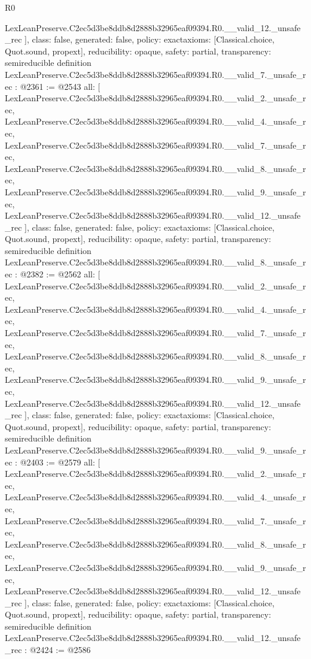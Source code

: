\begin{lexlean}{R0}
\begin{coremodule}
{    LexLeanPreserve.C2ec5d3be8ddb8d2888b32965eaf09394.R0.__valid_12._unsafe_rec
  ],
  class: false,
  generated: false,
  policy: exact{axioms: [Classical.choice, Quot.sound, propext]},
  reducibility: opaque{},
  safety: partial,
  transparency: semireducible
}
definition LexLeanPreserve.C2ec5d3be8ddb8d2888b32965eaf09394.R0.__valid_7._unsafe_rec : @2361 := @2543 {
  all: [
    LexLeanPreserve.C2ec5d3be8ddb8d2888b32965eaf09394.R0.__valid_2._unsafe_rec,
    LexLeanPreserve.C2ec5d3be8ddb8d2888b32965eaf09394.R0.__valid_4._unsafe_rec,
    LexLeanPreserve.C2ec5d3be8ddb8d2888b32965eaf09394.R0.__valid_7._unsafe_rec,
    LexLeanPreserve.C2ec5d3be8ddb8d2888b32965eaf09394.R0.__valid_8._unsafe_rec,
    LexLeanPreserve.C2ec5d3be8ddb8d2888b32965eaf09394.R0.__valid_9._unsafe_rec,
    LexLeanPreserve.C2ec5d3be8ddb8d2888b32965eaf09394.R0.__valid_12._unsafe_rec
  ],
  class: false,
  generated: false,
  policy: exact{axioms: [Classical.choice, Quot.sound, propext]},
  reducibility: opaque{},
  safety: partial,
  transparency: semireducible
}
definition LexLeanPreserve.C2ec5d3be8ddb8d2888b32965eaf09394.R0.__valid_8._unsafe_rec : @2382 := @2562 {
  all: [
    LexLeanPreserve.C2ec5d3be8ddb8d2888b32965eaf09394.R0.__valid_2._unsafe_rec,
    LexLeanPreserve.C2ec5d3be8ddb8d2888b32965eaf09394.R0.__valid_4._unsafe_rec,
    LexLeanPreserve.C2ec5d3be8ddb8d2888b32965eaf09394.R0.__valid_7._unsafe_rec,
    LexLeanPreserve.C2ec5d3be8ddb8d2888b32965eaf09394.R0.__valid_8._unsafe_rec,
    LexLeanPreserve.C2ec5d3be8ddb8d2888b32965eaf09394.R0.__valid_9._unsafe_rec,
    LexLeanPreserve.C2ec5d3be8ddb8d2888b32965eaf09394.R0.__valid_12._unsafe_rec
  ],
  class: false,
  generated: false,
  policy: exact{axioms: [Classical.choice, Quot.sound, propext]},
  reducibility: opaque{},
  safety: partial,
  transparency: semireducible
}
definition LexLeanPreserve.C2ec5d3be8ddb8d2888b32965eaf09394.R0.__valid_9._unsafe_rec : @2403 := @2579 {
  all: [
    LexLeanPreserve.C2ec5d3be8ddb8d2888b32965eaf09394.R0.__valid_2._unsafe_rec,
    LexLeanPreserve.C2ec5d3be8ddb8d2888b32965eaf09394.R0.__valid_4._unsafe_rec,
    LexLeanPreserve.C2ec5d3be8ddb8d2888b32965eaf09394.R0.__valid_7._unsafe_rec,
    LexLeanPreserve.C2ec5d3be8ddb8d2888b32965eaf09394.R0.__valid_8._unsafe_rec,
    LexLeanPreserve.C2ec5d3be8ddb8d2888b32965eaf09394.R0.__valid_9._unsafe_rec,
    LexLeanPreserve.C2ec5d3be8ddb8d2888b32965eaf09394.R0.__valid_12._unsafe_rec
  ],
  class: false,
  generated: false,
  policy: exact{axioms: [Classical.choice, Quot.sound, propext]},
  reducibility: opaque{},
  safety: partial,
  transparency: semireducible
}
definition LexLeanPreserve.C2ec5d3be8ddb8d2888b32965eaf09394.R0.__valid_12._unsafe_rec : @2424 := @2586 {
}
\end{coremodule}
\end{lexlean}
